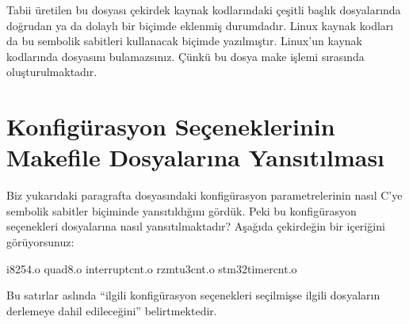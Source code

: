 \documentclass[a4paper,10pt,turkish]{sphinxmanual}
\begin{document}
\begin{sphinxVerbatim}[commandchars=\\\{\}]
\end{sphinxVerbatim}

\sphinxAtStartPar
Tabii üretilen bu  dosyası çekirdek kaynak kodlarındaki çeşitli başlık dosyalarında
doğrudan ya da dolaylı bir biçimde eklenmiş durumdadır. Linux kaynak kodları da bu sembolik sabitleri
kullanacak biçimde yazılmıştır. Linux’un kaynak kodlarında  dosyasını bulamazsınız.
Çünkü bu dosya make işlemi sırasında oluşturulmaktadır.


\section{Konfigürasyon Seçeneklerinin Makefile Dosyalarına Yansıtılması}
\label{\detokenize{kernelcompilation:konfigurasyon-seceneklerinin-makefile-dosyalarina-yansitilmasi}}
\sphinxAtStartPar
Biz yukarıdaki paragrafta  dosyasındaki konfigürasyon parametrelerinin nasıl C’ye sembolik
sabitler biçiminde yansıtıldığını gördük. Peki bu konfigürasyon seçenekleri  dosyalarına
nasıl yansıtılmaktadır? Aşağıda çekirdeğin bir  içeriğini görüyorsunuz:

\begin{sphinxVerbatim}[commandchars=\\\{\}]
i8254.o
\PYGZhy{}quad\PYGZhy{}8.o
interrupt\PYGZhy{}cnt.o
rz\PYGZhy{}mtu3\PYGZhy{}cnt.o
stm32\PYGZhy{}timer\PYGZhy{}cnt.o
\end{sphinxVerbatim}

\sphinxAtStartPar
Bu satırlar aslında “ilgili konfigürasyon seçenekleri seçilmişse ilgili dosyaların derlemeye dahil
edileceğini” belirtmektedir.
\end{document}
